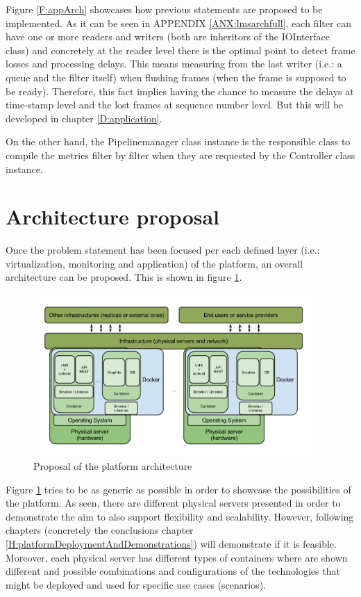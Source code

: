 Figure \ref{F:appArch} showcases how previous statements are proposed to be implemented. As it can be seen in APPENDIX \ref{ANX:lmsarchfull}, each filter can have one or more readers and writers (both are inheritors of the IOInterface class) and concretely at the reader level there is the optimal point to detect frame losses and processing delays. This means measuring from the last writer (i.e.: a queue and the filter itself) when flushing frames (when the frame is supposed to be ready). Therefore, this fact implies having the chance to measure the delays at time-stamp level and the lost frames at sequence number level. But this will be developed in chapter \ref{D:application}.

On the other hand, the Pipelinemanager class instance is the responsible class to compile the metrics filter by filter when they are requested by the Controller class instance. 

\section{Architecture proposal}

Once the problem statement has been focused per each defined layer (i.e.: virtualization, monitoring and application) of the platform, an overall architecture can be proposed. This is shown in figure \ref{F:overallArchProp}.

\begin{figure}[!htb]
\begin{center}
\includegraphics[width=0.95\textwidth]{./images/overallArchProp.png}
\caption{Proposal of the platform architecture}
\label{F:overallArchProp}
\end{center}
\end{figure}

Figure \ref{F:overallArchProp} tries to be as generic as possible in order to showcase the possibilities of the platform. As seen, there are different physical servers presented in order to demonstrate the aim to also support flexibility and scalability. However, following chapters (concretely the conclusions chapter \ref{H:platformDeploymentAndDemonstrations}) will demonstrate if it is feasible. 
Moreover, each physical server has different types of containers where are shown different and possible combinations and configurations of the technologies that might be deployed and used for specific use cases (scenarios).


